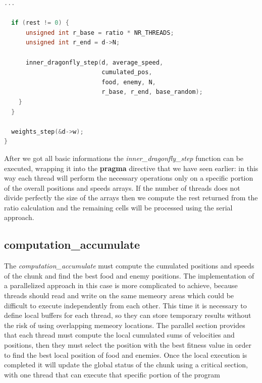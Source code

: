 \documentclass[10pt]{article}
\begin{document}
\begin{multicols}{2}
\begin{lstlisting}[language=C,caption={parallelized dragonfly-compute-step}]
  ...

  if (rest != 0) {
      unsigned int r_base = ratio * NR_THREADS;
      unsigned int r_end = d->N;

      inner_dragonfly_step(d, average_speed, 
                           cumulated_pos, 
                           food, enemy, N,
                           r_base, r_end, base_random);
    }
  }

  weights_step(&d->w);
}

\end{lstlisting}


\noindent After we got all basic informations the \textit{inner\_dragonfly\_step}
function can be executed, wrapping it into the \textbf{pragma} directive that we have seen earlier: in this way each thread will 
perform the necessary operations only on a specific portion of the overall positions and speeds arrays.
If the number of threads does not divide perfectly the size of the arrays then we compute the rest
returned from the ratio calculation and the remaining cells will be processed using the serial approach.

\subsection*{computation\_accumulate}

The \textit{computation\_accumulate}  must compute
the cumulated positions and speeds of the chunk and find the best food and enemy positions.
The implementation of a parallelized approach in this case  is more complicated to achieve, 
because threads should read and write on the same memeory areas which could be 
difficult to execute independently from each other. This time it is necessary to define
local buffers for each thread, so they can store temporary results without the risk of using
overlapping memeory locations. The parallel section provides that each thread must compute the local
cumulated sums of velocities and positions, then they must select the position with the best fitness value
in order to find the best local position of food and enemies. Once the local execution is completed
it will update the global status of the chunk using a critical section, with one thread that can execute that
specific portion of the program


\end{multicols}
\end{document}
